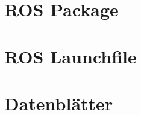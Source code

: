 \begin{appendix}


    \section{ROS Package}
    \label{app:rosp}
    
    \section{ROS Launchfile}
    \label{app:roslaunch}
    
    \section{Datenblätter}
    \label{app:daten}
    
    
\end{appendix}


